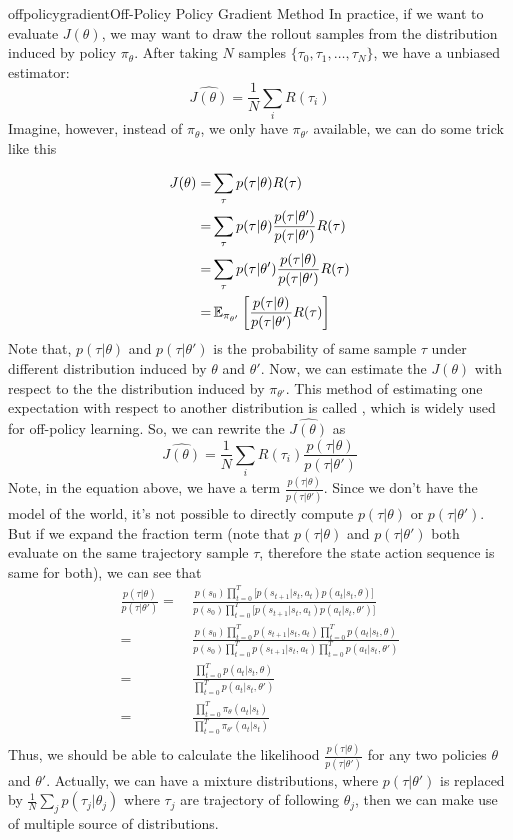 \documentclass[9pt]{article}
\begin{document}
\begin{topic}{offpolicygradient}{Off-Policy Policy Gradient Method}
In practice, if we want to evaluate $J(\theta)$, we may want to draw the rollout samples from the distribution induced by policy $\pi_{\theta}$. After taking $N$ samples $\{\tau_0,\tau_1,\ldots,\tau_N\}$, we have a unbiased estimator:
\[
	\hat{J(\theta)} = \frac{1}{N}\sum_{i}R(\tau_i)
\]
Imagine, however, instead of $\pi_{\theta}$, we only have $\pi_{\theta'}$ available, we can do some trick like this
\begin{comment}
need to figure why can we ignore the dynamic model
\end{comment}
\[
\begin{split}
J(\theta) = & \sum_{\tau}p(\tau|\theta)R(\tau)\\
= & \sum_{\tau}p(\tau|\theta) \frac{p(\tau|\theta')}{p(\tau|\theta')} R(\tau)\\
= & \sum_{\tau}p(\tau|\theta') \frac{p(\tau|\theta)}{p(\tau|\theta')} R(\tau)\\
= & \operatorname{\mathbb{E}}_{\pi_{\theta'}}\bigg[\frac{p(\tau|\theta)}{p(\tau|\theta')} R(\tau)\bigg]
\end{split}
\]
Note that, $p(\tau|\theta)$ and $p(\tau|\theta')$ is the probability of same sample $\tau$ under different distribution induced by $\theta$ and $\theta'$. Now, we can estimate the $J(\theta)$ with respect to the the distribution induced by $\pi_{\theta'}$. This method of estimating one expectation with respect to another distribution is called , which is widely used for off-policy learning. So, we can rewrite the $\hat{J(\theta)}$ as
\[
\hat{J(\theta)} = \frac{1}{N}\sum_{i}R(\tau_i)\frac{p(\tau|\theta)}{p(\tau|\theta')}
\]
Note, in the equation above, we have a term $\frac{p(\tau|\theta)}{p(\tau|\theta')}$. Since we don't have the model of the world, it's not possible to directly compute $p(\tau|\theta)$ or $p(\tau|\theta')$. But if we expand the fraction term (note that $p(\tau|\theta)$ and $p(\tau|\theta')$ both evaluate on the same trajectory sample $\tau$, therefore the state action sequence is same for both), we can see that 
\[
\begin{split}
\frac{p(\tau|\theta)}{p(\tau|\theta')} = &\ \frac{p(s_0)\prod_{t=0}^T\big[p(s_{t+1}|s_t,a_t)p(a_t|s_t, \theta)\big]}{p(s_0)\prod_{t=0}^T\big[p(s_{t+1}|s_t,a_t)p(a_t|s_t,\theta')\big]}\\
= &\ \frac{p(s_0)\prod_{t=0}^Tp(s_{t+1}|s_t,a_t)\prod_{t=0}^Tp(a_t|s_t, \theta)}{p(s_0)\prod_{t=0}^Tp(s_{t+1}|s_t,a_t)\prod_{t=0}^Tp(a_t|s_t,\theta')}\\
= &\ \frac{\prod_{t=0}^Tp(a_t|s_t,\theta)}{\prod_{t=0}^Tp(a_t|s_t,\theta')}\\
= &\ \frac{\prod_{t=0}^T\pi_{\theta}(a_t|s_t)}{\prod_{t=0}^T\pi_{\theta'}(a_t|s_t)}\\
\end{split}
\]
Thus, we should be able to calculate the likelihood $\frac{p(\tau|\theta)}{p(\tau|\theta')}$ for any two policies $\theta$
 and $\theta'$. Actually, we can have a mixture distributions, where $p(\tau|\theta')$ is replaced by $\frac{1}{N}\sum_jp(\tau_j|\theta_j)$ where $\tau_j$ are trajectory of following $\theta_j$, then we can make use of multiple source of distributions.
\end{topic}
\end{document}
